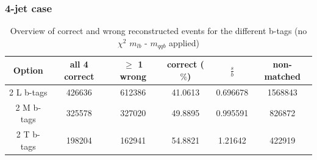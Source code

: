 \subsubsection{4-jet case}
\begin{table}[!h] 
 \begin{tabular}{c|c|c|c|c|c} 
  \textbf{Option} & all 4 correct & $\geq$ 1 wrong       & correct ($\%$)       & $\frac{s}{b}$ & non-matched \\ \hline 
  2 L b-tags              & 426636 & 612386 & 41.0613 & 0.696678 & 1568843\\ 
  2 M b-tags              & 325578 & 327020 & 49.8895 & 0.995591 & 826872\\ 
  2 T b-tags              & 198204 & 162941 & 54.8821 & 1.21642 & 422919\\ 
 \end{tabular} 
 \caption{Overview of correct and wrong reconstructed events for the different b-tags (no $\chi^{2}$ $m_{lb}$ - $m_{qqb}$ applied)}
\end{table} 
 
